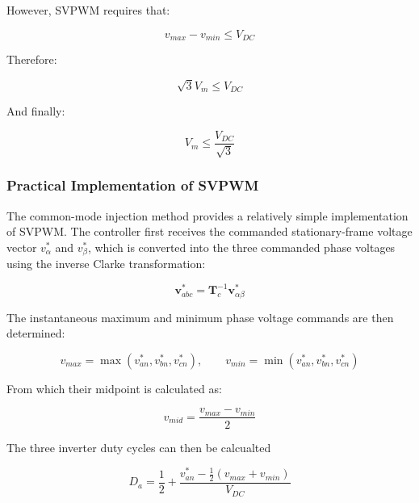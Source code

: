 \documentclass{article}
\begin{document}
However, SVPWM requires that:

\begin{equation}
    v_{max} - v_{min} \leq V_{DC}
\end{equation}

Therefore:

\begin{equation}
    \sqrt{3}V_m \leq V_{DC}
\end{equation}

And finally:

\begin{equation}
    V_m \leq \frac{V_{DC}}{\sqrt{3}}
\end{equation}


\subsubsection{Practical Implementation of SVPWM}
\label{sec:practical-implementation-of-svpwm}

The common-mode injection method provides a relatively simple implementation of SVPWM. The controller first receives the commanded stationary-frame voltage vector $v_\alpha^*$ and $v_\beta^*$, which is converted into the three commanded phase voltages using the inverse Clarke transformation:

\begin{equation}
    \mathbf{v}_{abc}^* = \mathbf{T}_c^{-1}\mathbf{v}_{\alpha\beta}^*
\end{equation}

The instantaneous maximum and minimum phase voltage commands are then determined:

\begin{equation}
    v_{max} = \max(v_{an}^*, v_{bn}^*, v_{cn}^*), \qquad
    v_{min} = \min(v_{an}^*, v_{bn}^*, v_{cn}^*)
\end{equation}

From which their midpoint is calculated as:

\begin{equation}
    v_{mid} = \frac{v_{max} - v_{min}}{2}
\end{equation}

The three inverter duty cycles can then be calcualted 

\begin{equation}
    D_a = \frac{1}{2} + \frac{v_{an}^* - \frac{1}{2}(v_{max} + v_{min})}{V_{DC}}
\end{equation}
\end{document}
